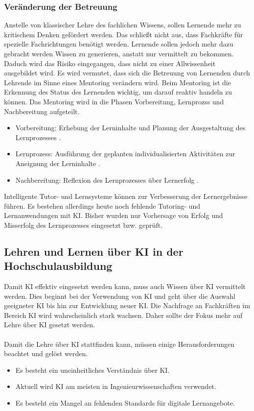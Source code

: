 \subsubsection*{Veränderung der Betreuung}
Anstelle von klassischer Lehre des fachlichen Wissens, sollen Lernende mehr zu kritischem Denken gefördert werden. Das schließt nicht aus, dass Fachkräfte für spezielle Fachrichtungen benötigt werden.
Lernende sollen jedoch mehr dazu gebracht werden Wissen zu generieren, anstatt nur vermittelt zu bekommen.
Daduch wird das Risiko eingegangen, dass nicht zu einer \glqq Allwissenheit\grqq{} ausgebildet wird.
Es wird vermutet, dass sich die Betreuung von Lernenden durch Lehrende im Sinne eines Mentoring verändern wird.
Beim Mentoring ist die Erkennung des Status des Lernenden wichtig, um darauf reaktiv handeln zu können.
Das Mentoring wird in die Phasen Vorbereitung, Lernprozss und Nachbereitung aufgeteilt. \cite*[S. 22f]{Witt.2020}
\begin{itemize}
      \item Vorbereitung: Erhebung der Lerninhalte und Planung der Ausgestaltung des Lernprozesses \cite*[S. 23]{Witt.2020}.
      \item Lernprozess: Ausführung der geplanten individualisierten Aktivitäten zur Aneignung der Lerninhalte \cite*[S. 23]{Witt.2020}.
      \item Nachbereitung: Reflexion des Lernprozesses über Lernerfolg \cite*[S. 23]{Witt.2020}.
\end{itemize}
Intelligente Tutor- und Lernsysteme können zur Verbesserung der Lernergebnisse führen.
Es bestehen allerdings heute noch fehlende Tutoring- und Lernanwendungen mit KI.
Bisher wurden nur Vorhersage von Erfolg und Misserfolg des Lernprozesses eingesetzt bzw. geprüft. \cite*[S. 24]{Witt.2020}

\subsection{Lehren und Lernen über KI in der Hochschulausbildung}
Damit KI effektiv eingesetzt werden kann, muss auch Wissen über KI vermittelt werden.
Dies beginnt bei der Verwendung von KI und geht über die Auswahl geeigneter KI bis hin zur Entwicklung neuer KI.
Die Nachfrage an Fachkräften im Bereich KI wird wahrscheinlich stark wachsen.
Daher sollte der Fokus mehr auf Lehre über KI gesetzt werden. \cite*[S. 26]{Witt.2020}
\\ \noindent
\\ \noindent
Damit die Lehre über KI stattfinden kann, müssen einige Herausforderungen beachtet und gelöst werden.\cite*[S. 27]{Witt.2020}
\begin{itemize}
      \item Es besteht ein uneinheitliches Verständnis über KI. \cite*[S. 27]{Witt.2020}
      \item Aktuell wird \ac{KI} am meisten in Ingenieurwissenschaften verwendet. \cite*[S. 27]{Witt.2020}
      \item Es besteht ein Mangel an fehlenden Standards für digitale Lernangebote. \cite*[S. 27]{Witt.2020}
\end{itemize}

